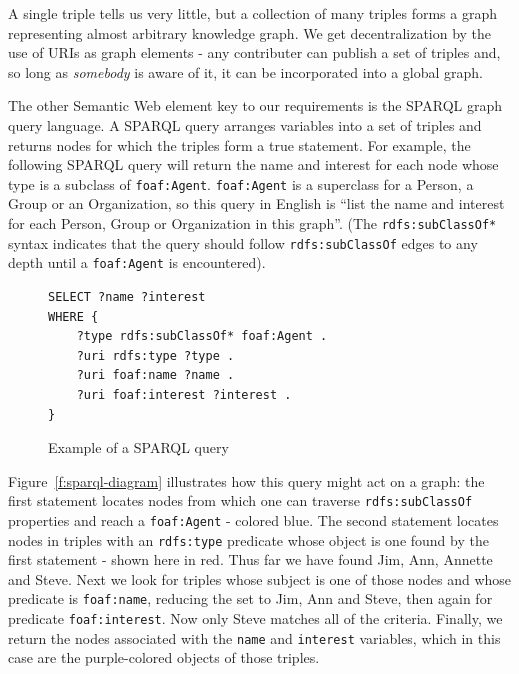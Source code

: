 A single triple tells us very little, but a collection of many triples 
forms a graph representing almost arbitrary knowledge graph. We get 
decentralization by the use of URIs as graph elements - any contributer 
can publish a set of triples and, so long as \emph{somebody} is aware of 
it, it can be incorporated into a global graph.

The other Semantic Web element key to our requirements is the SPARQL 
graph query language. A SPARQL query 
arranges variables into a set of triples and returns nodes for which
the triples form a true statement. For example, the following SPARQL query
will return the name and interest for each node whose type is 
a subclass of \texttt{foaf:Agent}. \texttt{foaf:Agent} is a superclass for a Person, a 
Group or an Organization, so this query in English is ``list the name and 
interest for each Person, Group or Organization in this graph''. (The 
\texttt{rdfs:subClassOf*} syntax indicates that the query should follow 
\texttt{rdfs:subClassOf} edges to any depth until a \texttt{foaf:Agent} 
is encountered).

\begin{figure}[H]
\begin{verbatim}
SELECT ?name ?interest 
WHERE {    
    ?type rdfs:subClassOf* foaf:Agent .
    ?uri rdfs:type ?type .
    ?uri foaf:name ?name .
    ?uri foaf:interest ?interest .
}
\end{verbatim}
\caption{Example of a SPARQL query}
\label{f:sparql}
\end{figure}

Figure~\ref{f:sparql-diagram} illustrates how this query might act on a graph: 
the first statement locates nodes from which one can traverse \texttt{rdfs:subClassOf} properties and reach a \texttt{foaf:Agent} - colored blue. The second statement 
locates nodes in triples with an \texttt{rdfs:type} predicate whose object 
is one found by the first statement - shown here in red. Thus far we have found Jim, 
Ann, Annette and Steve. Next we look for triples whose subject is one of those nodes
and whose predicate is \texttt{foaf:name}, reducing the set to Jim, Ann and Steve, then
again for predicate \texttt{foaf:interest}. Now only Steve matches all of the criteria.
Finally, we return the nodes associated with the \texttt{name} and \texttt{interest} 
variables, which in this case are the purple-colored objects of those triples.

